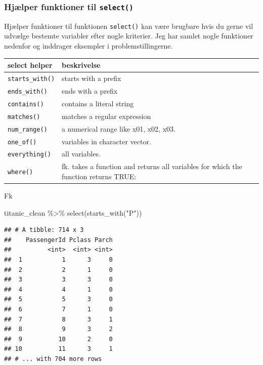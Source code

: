 \documentclass[
]{book}
\newenvironment{Shaded}{\begin{snugshade}}{\end{snugshade}}
\newcommand{\FunctionTok}[1]{\textcolor[rgb]{0.00,0.00,0.00}{#1}}
\newcommand{\NormalTok}[1]{#1}
\newcommand{\SpecialCharTok}[1]{\textcolor[rgb]{0.00,0.00,0.00}{#1}}
\newcommand{\StringTok}[1]{\textcolor[rgb]{0.31,0.60,0.02}{#1}}
\begin{document}
\hypertarget{hjuxe6lper-funktioner-til-select}{%
\subsubsection{\texorpdfstring{Hjælper funktioner til \texttt{select()}}{Hjælper funktioner til select()}}\label{hjuxe6lper-funktioner-til-select}}

Hjælper funktioner til funktionen \texttt{select()} kan være brugbare hvis du gerne vil udvælge bestemte variabler efter nogle kriterier. Jeg har samlet nogle funktioner nedenfor og inddrager eksempler i problemstillingerne.

\begin{longtable}[]{@{}
  >{\raggedright\arraybackslash}p{}
  >{\raggedright\arraybackslash}p{}@{}}
\toprule
select helper & beskrivelse \\
\midrule
\endhead
\texttt{starts\_with()} & starts with a prefix \\
\texttt{ends\_with()} & ends with a prefix \\
\texttt{contains()} & contains a literal string \\
\texttt{matches()} & matches a regular expression \\
\texttt{num\_range()} & a numerical range like x01, x02, x03. \\
\texttt{one\_of()} & variables in character vector. \\
\texttt{everything()} & all variables. \\
\texttt{where()} & fk. takes a function and returns all variables for which the function returns TRUE: \\
\bottomrule
\end{longtable}

Fk

\begin{Shaded}
\begin{Highlighting}[]
\NormalTok{titanic\_clean }\SpecialCharTok{\%\textgreater{}\%} \FunctionTok{select}\NormalTok{(}\FunctionTok{starts\_with}\NormalTok{(}\StringTok{"P"}\NormalTok{))}
\end{Highlighting}
\end{Shaded}

\begin{verbatim}
## # A tibble: 714 x 3
##    PassengerId Pclass Parch
##          <int>  <int> <int>
##  1           1      3     0
##  2           2      1     0
##  3           3      3     0
##  4           4      1     0
##  5           5      3     0
##  6           7      1     0
##  7           8      3     1
##  8           9      3     2
##  9          10      2     0
## 10          11      3     1
## # ... with 704 more rows
\end{verbatim}
\end{document}
